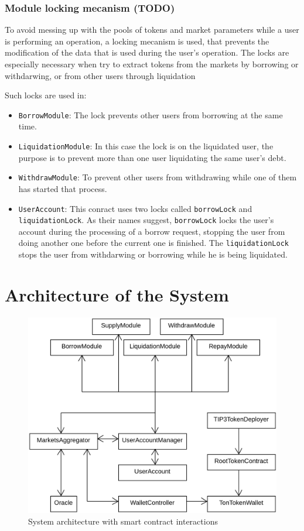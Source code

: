\subsubsection{Module locking mecanism (TODO)} 

To avoid messing up with the pools of tokens and market parameters while a user is performing an operation, a locking mecanism is used, that prevents the modification of the data that is used during the user's operation. The locks are especially necessary when try to extract tokens from the markets by borrowing or withdarwing, or from other users through liquidation 

Such locks are used in:
\begin{itemize}
  \item \verb|BorrowModule|: The lock prevents other users from borrowing at the same time.
  \item \verb|LiquidationModule|: In this case the lock is on the liquidated user, the purpose is to prevent more than one user liquidating the same user's debt. 
  \item \verb|WithdrawModule|: To prevent other users from withdrawing while one of them has started that process. 
  \item \verb|UserAccount|: This conract uses two locks called \verb|borrowLock| and \verb|liquidationLock|. As their names suggest, \verb|borrowLock| locks the user's account during the processing of a borrow request, stopping the user from doing another one before the current one is finished. The \verb|liquidationLock| stops the user from withdarwing or borrowing while he is being liquidated. 
\end{itemize}

\section{Architecture of the System}

\begin{figure}[h!]
  \includegraphics[width=\textwidth]{./assets/archi.png}
  \caption{System architecture with smart contract interactions}
  \label{fig:archi}
  \captionsetup[figure]{list=no} %
\end{figure}

